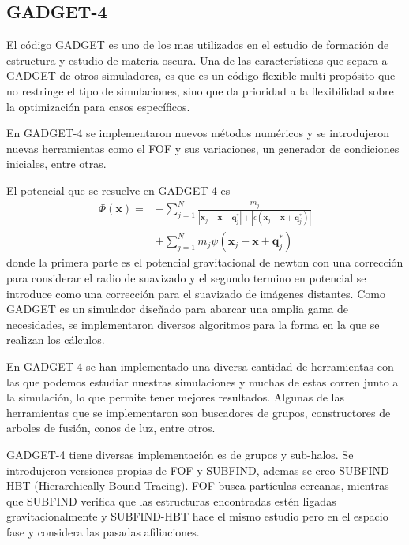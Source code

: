 \documentclass{beamer}
\begin{document}
\subsection{GADGET-4}
	\begin{frame}
		El código GADGET es uno de los mas utilizados en el estudio de formación de estructura y estudio de materia oscura. Una de las características que separa a GADGET de otros simuladores, es que es un código flexible multi-propósito que no restringe el tipo de simulaciones, sino que da prioridad a la flexibilidad sobre la optimización para casos específicos.
		
		En GADGET-4 se implementaron nuevos métodos numéricos y se introdujeron nuevas herramientas como el FOF y sus variaciones, un generador de condiciones iniciales, entre otras.

	\end{frame}
	
	
	\begin{frame}
		El potencial que se resuelve en GADGET-4 es 
		\begin{align}
    \Phi (\textbf{x}) = &- \sum_{j=1}^{N} \frac{m_j}{|\textbf{x}_j-\textbf{x}+\textbf{q}^*_j| + |\epsilon(\textbf{x}_j-\textbf{x}+\textbf{q}^*_j)|} \nonumber \\
    &+ \sum_{j=1}^{N} m_j \psi (\textbf{x}_j-\textbf{x}+\textbf{q}^*_j) \label{eq:Pot}
\end{align}
		donde la primera parte es el potencial gravitacional de newton con una corrección para considerar el radio de suavizado y el segundo termino en potencial se introduce como una corrección para el suavizado de imágenes distantes. Como GADGET es un simulador diseñado para abarcar una amplia gama de necesidades, se implementaron diversos algoritmos para la forma en la que se realizan los cálculos.
	\end{frame}
	
	\begin{frame}
		En GADGET-4 se han implementado una diversa cantidad de herramientas con las que podemos estudiar nuestras simulaciones y muchas de estas corren junto a la simulación, lo que permite tener mejores resultados. Algunas de las herramientas que se implementaron son buscadores de grupos, constructores de arboles de fusión, conos de luz, entre otros.
	\end{frame}
	
	\begin{frame}
		GADGET-4 tiene diversas implementación es de grupos y sub-halos. Se introdujeron versiones propias de FOF y SUBFIND, ademas se creo SUBFIND-HBT (Hierarchically Bound Tracing). FOF busca partículas cercanas, mientras que SUBFIND verifica que las estructuras encontradas estén ligadas gravitacionalmente y SUBFIND-HBT hace el mismo estudio pero en el espacio fase y considera las pasadas afiliaciones.
	
	\end{frame}
\end{document}
